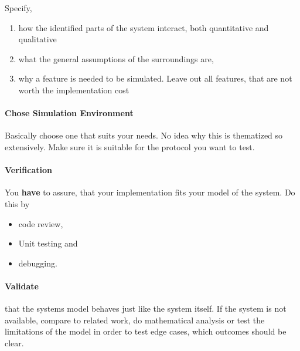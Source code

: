 \documentclass[english]{panikzettel}
\begin{document}
	Specify, 
	\begin{enumerate}
		\item how the identified parts of the system interact, both quantitative and qualitative
		\item what the general assumptions of the surroundings are,
		\item why a feature is needed to be simulated. Leave out all features, that are not worth the implementation cost
	\end{enumerate}

	\paragraph{Chose Simulation Environment}
	\label{pgf:performance-evaluation-study:chose-simulation-environment}
	
	Basically choose one that suits your needs. No idea why this is thematized so extensively.	
	Make sure it is suitable for the protocol you want to test.
	
	\paragraph{Verification}
	\label{pgf:performance-evaluation-study-:verification}
	
	You \textbf{have} to assure, that your implementation fits your model of the system. 
	Do this by 
	\begin{itemize}
		\item code review,
		\item Unit testing and
		\item debugging.
	\end{itemize}

	\paragraph{Validate}
	\label{pgf:performance-evaluation-study-:validate}
	
	that the systems model behaves just like the system itself.
	If the system is not available, compare to related work, do mathematical analysis or test the limitations of the model in order to test edge cases, which outcomes should be clear.
	
	
	
	
	
	
	
		

	





	
	
 	
	
		
	

		
		
		
			
			
			
	
	
	
	
	
				
\end{document}
